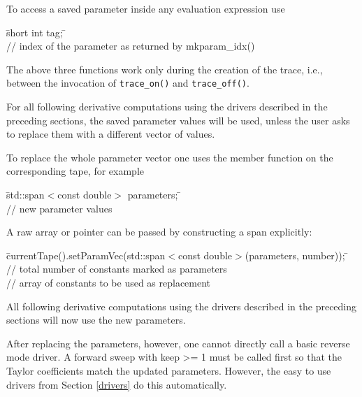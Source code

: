\documentclass[11pt,twoside]{article}
\begin{document}
To access a saved parameter inside any evaluation expression use
\begin{tabbing}
\hspace{0.5in}\={\sf short int tag;} \hspace{1.1in}\= \kill    %
\\
 \> // index of the parameter as returned by
mkparam\_idx()\\
\end{tabbing}

The above three functions work only during the creation of the trace,
i.e., between the invocation of \verb=trace_on()= and \verb=trace_off()=.

For all following derivative computations using the drivers described
in the preceding sections, the saved parameter values will be used,
unless the user asks to replace them with a different vector of
values.

To replace the whole parameter vector one uses the member function on
the corresponding tape, for example
\begin{tabbing}
\hspace{0.5in}\={\sf std::span$<$const double$>$ parameters;} \hspace{1.1in}\= \kill    %
\\
 \> // new parameter values\\
\end{tabbing}
A raw array or pointer can be passed by constructing a span explicitly:
\begin{tabbing}
\hspace{0.5in}\={\sf currentTape().setParamVec(std::span$<$const double$>$(parameters, number));} \hspace{1.1in}\= \kill    %
\\
  \> // total number of constants marked as
parameters\\
 \> // array of constants to be used as replacement\\
\end{tabbing}
All following derivative computations using the drivers described in
the preceding sections will now use the new parameters. 

After replacing the parameters, however, one cannot directly call a basic
reverse mode driver. A forward sweep with {\sf keep >= 1} must be called
first so that the Taylor coefficients match the updated parameters. However,
the easy to use drivers from Section \ref{drivers} do this automatically.
%
\end{document}
